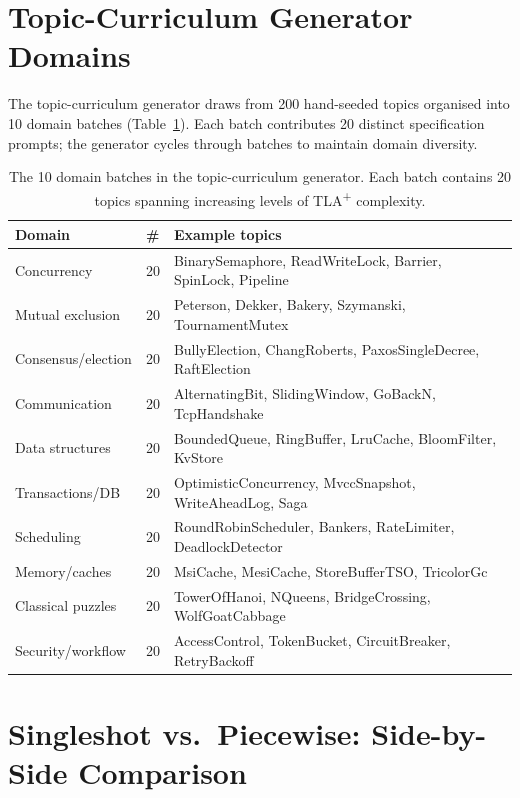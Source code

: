 \documentclass[11pt]{article}
\begin{document}
\section{Topic-Curriculum Generator Domains}
\label{sec:app-topics}

The topic-curriculum generator draws from 200 hand-seeded topics
organised into 10 domain batches (Table~\ref{tab:topic-domains}).
Each batch contributes 20 distinct specification prompts; the
generator cycles through batches to maintain domain diversity.

\begin{table}[h]
\centering
\small
\setlength{\tabcolsep}{4pt}
\begin{tabular}{@{}llp{54mm}@{}}
\toprule
Domain & \# & Example topics \\
\midrule
Concurrency       & 20 & BinarySemaphore, ReadWriteLock, Barrier, SpinLock, Pipeline \\
Mutual exclusion   & 20 & Peterson, Dekker, Bakery, Szymanski, TournamentMutex \\
Consensus/election & 20 & BullyElection, ChangRoberts, PaxosSingleDecree, RaftElection \\
Communication      & 20 & AlternatingBit, SlidingWindow, GoBackN, TcpHandshake \\
Data structures    & 20 & BoundedQueue, RingBuffer, LruCache, BloomFilter, KvStore \\
Transactions/DB    & 20 & OptimisticConcurrency, MvccSnapshot, WriteAheadLog, Saga \\
Scheduling         & 20 & RoundRobinScheduler, Bankers, RateLimiter, DeadlockDetector \\
Memory/caches      & 20 & MsiCache, MesiCache, StoreBufferTSO, TricolorGc \\
Classical puzzles  & 20 & TowerOfHanoi, NQueens, BridgeCrossing, WolfGoatCabbage \\
Security/workflow  & 20 & AccessControl, TokenBucket, CircuitBreaker, RetryBackoff \\
\bottomrule
\end{tabular}
\caption{The 10 domain batches in the topic-curriculum generator.
Each batch contains 20 topics spanning increasing levels of
TLA\textsuperscript{+} complexity.}
\label{tab:topic-domains}
\end{table}

\section{Singleshot vs.\ Piecewise: Side-by-Side Comparison}
\label{sec:app-piecewise-comparison}
\end{document}
